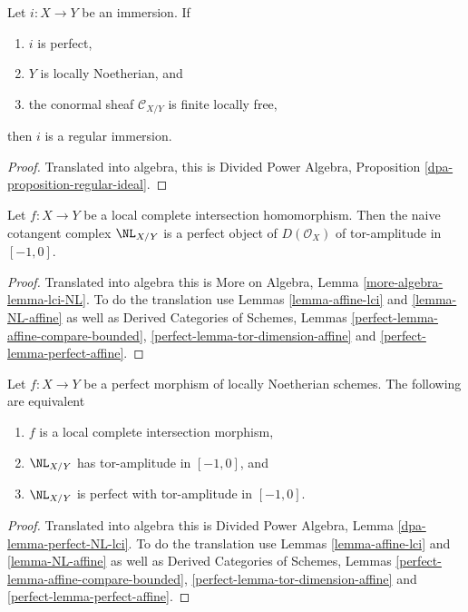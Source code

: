 \begin{lemma}
\label{lemma-perfect-conormal-free-lci}
Let $i : X \to Y$ be an immersion. If
\begin{enumerate}
\item $i$ is perfect,
\item $Y$ is locally Noetherian, and
\item the conormal sheaf $\mathcal{C}_{X/Y}$ is finite locally free,
\end{enumerate}
then $i$ is a regular immersion.
\end{lemma}

\begin{proof}
Translated into algebra, this is
Divided Power Algebra, Proposition \ref{dpa-proposition-regular-ideal}.
\end{proof}

\begin{lemma}
\label{lemma-lci-NL}
Let $f : X \to Y$ be a local complete intersection homomorphism.
Then the naive cotangent complex $\NL_{X/Y}$ is a perfect object
of $D(\mathcal{O}_X)$ of tor-amplitude in $[-1, 0]$.
\end{lemma}

\begin{proof}
Translated into algebra this is
More on Algebra, Lemma \ref{more-algebra-lemma-lci-NL}.
To do the translation use
Lemmas \ref{lemma-affine-lci} and
\ref{lemma-NL-affine} as well as
Derived Categories of Schemes, Lemmas
\ref{perfect-lemma-affine-compare-bounded},
\ref{perfect-lemma-tor-dimension-affine} and
\ref{perfect-lemma-perfect-affine}.
\end{proof}

\begin{lemma}
\label{lemma-perfect-NL-lci}
Let $f : X \to Y$ be a perfect morphism of locally Noetherian schemes.
The following are equivalent
\begin{enumerate}
\item $f$ is a local complete intersection morphism,
\item $\NL_{X/Y}$ has tor-amplitude in $[-1, 0]$, and
\item $\NL_{X/Y}$ is perfect with tor-amplitude in $[-1, 0]$.
\end{enumerate}
\end{lemma}

\begin{proof}
Translated into algebra this is
Divided Power Algebra, Lemma \ref{dpa-lemma-perfect-NL-lci}.
To do the translation use
Lemmas \ref{lemma-affine-lci} and
\ref{lemma-NL-affine} as well as
Derived Categories of Schemes, Lemmas
\ref{perfect-lemma-affine-compare-bounded},
\ref{perfect-lemma-tor-dimension-affine} and
\ref{perfect-lemma-perfect-affine}.
\end{proof}

